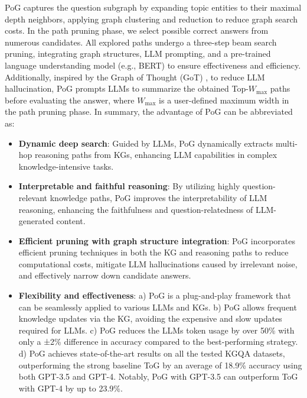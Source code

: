 PoG captures the question subgraph by expanding topic entities to their maximal depth neighbors, applying graph clustering and reduction to reduce graph search costs.
In the path pruning phase, we select possible correct answers from numerous candidates. All explored paths undergo a three-step beam search pruning, integrating graph structures, LLM prompting, and a pre-trained language understanding model (e.g., BERT) to ensure effectiveness and efficiency. 
Additionally, inspired by the Graph of Thought (GoT) \cite{besta2024graphGoT}, to reduce LLM hallucination, PoG prompts LLMs to summarize the obtained Top-$W_{\max}$ paths before evaluating the answer, where $W_{\max}$ is a user-defined maximum width in the path pruning phase.
In summary, 
the advantage of PoG can be abbreviated as: 
\begin{itemize}[leftmargin=*]
\item \textbf{Dynamic deep search}: Guided by LLMs, PoG dynamically extracts multi-hop reasoning paths from KGs, enhancing LLM capabilities in complex knowledge-intensive tasks.
\item \textbf{Interpretable and faithful reasoning}: 
By utilizing highly question-relevant knowledge paths, PoG improves the interpretability of LLM reasoning, enhancing the faithfulness and question-relatedness of LLM-generated content.
\item \textbf{Efficient pruning with graph structure integration}: 
PoG incorporates efficient pruning techniques in both the KG and reasoning paths to reduce computational costs, mitigate LLM hallucinations caused by irrelevant noise, and effectively narrow down candidate answers.
\item \textbf{Flexibility and effectiveness}:
a) PoG is a plug-and-play framework that can be seamlessly applied to various LLMs and KGs.
b) PoG allows frequent knowledge updates via the KG, avoiding the expensive and slow updates required for LLMs.
c) PoG reduces the LLMs token usage by over 50\% with only a ±2\% difference in accuracy compared to the best-performing strategy.
d) PoG achieves state-of-the-art results on all the tested KGQA datasets, outperforming the strong baseline ToG by an average of 18.9\% accuracy using both GPT-3.5 and GPT-4. Notably, PoG with GPT-3.5 can outperform ToG with GPT-4 by up to 23.9\%.
\end{itemize}
\vspace{-3mm}


